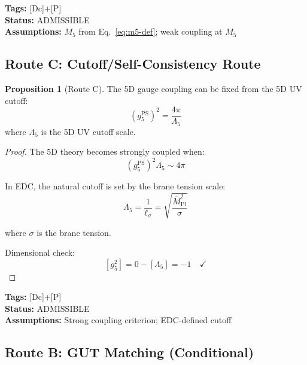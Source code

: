 \documentclass[11pt,a4paper]{article}
\theoremstyle{definition}
\newtheorem{proposition}[theorem]{Proposition}
\begin{document}
\textbf{Tags:} [Dc]+[P] \\
\textbf{Status:} ADMISSIBLE \\
\textbf{Assumptions:} $M_5$ from Eq.~\eqref{eq:m5-def}; weak coupling at $M_5$

\subsection{Route C: Cutoff/Self-Consistency Route}
\label{subsec:route-c}

\begin{routebox}
\begin{proposition}[Route C]
\label{prop:route-c}
The 5D gauge coupling can be fixed from the 5D UV cutoff:
\begin{equation}
\label{eq:route-c-formula}
\boxed{(g_5^{\text{PS}})^2 = \frac{4\pi}{\Lambda_5}}
\end{equation}
where $\Lambda_5$ is the 5D UV cutoff scale.
\end{proposition}
\end{routebox}

\begin{proof}
The 5D theory becomes strongly coupled when:
\begin{equation}
\label{eq:strong-coupling}
(g_5^{\text{PS}})^2 \Lambda_5 \sim 4\pi
\end{equation}

In EDC, the natural cutoff is set by the brane tension scale:
\begin{equation}
\label{eq:lambda5-edc}
\Lambda_5 = \frac{1}{\ell_\sigma} = \sqrt{\frac{\bar{M}_{\text{Pl}}^2}{\sigma}}
\end{equation}

where $\sigma$ is the brane tension.

Dimensional check:
\begin{equation}
\label{eq:route-c-dim}
[g_5^2] = 0 - [\Lambda_5] = -1 \quad \checkmark
\end{equation}
\end{proof}

\textbf{Tags:} [Dc]+[P] \\
\textbf{Status:} ADMISSIBLE \\
\textbf{Assumptions:} Strong coupling criterion; EDC-defined cutoff

\subsection{Route B: GUT Matching (Conditional)}
\label{subsec:route-b}
\end{document}
